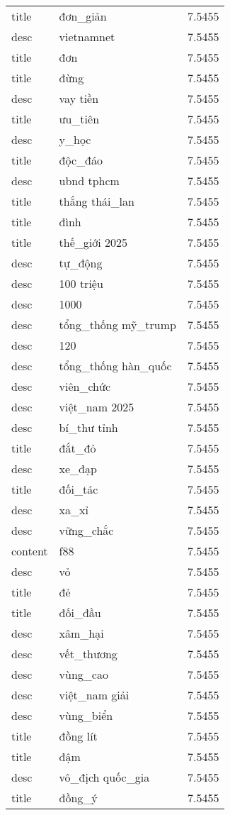 \documentclass{article}
\begin{document}
\begin{tabular}{lll}
title & đơn\_giản & 7.5455\\
desc & vietnamnet & 7.5455\\
title & đơn & 7.5455\\
title & đừng & 7.5455\\
desc & vay tiền & 7.5455\\
title & ưu\_tiên & 7.5455\\
desc & y\_học & 7.5455\\
title & độc\_đáo & 7.5455\\
desc & ubnd tphcm & 7.5455\\
title & thắng thái\_lan & 7.5455\\
title & đình & 7.5455\\
title & thế\_giới 2025 & 7.5455\\
desc & tự\_động & 7.5455\\
desc & 100 triệu & 7.5455\\
desc & 1000 & 7.5455\\
desc & tổng\_thống mỹ\_trump & 7.5455\\
desc & 120 & 7.5455\\
desc & tổng\_thống hàn\_quốc & 7.5455\\
desc & viên\_chức & 7.5455\\
desc & việt\_nam 2025 & 7.5455\\
desc & bí\_thư tỉnh & 7.5455\\
title & đắt\_đỏ & 7.5455\\
desc & xe\_đạp & 7.5455\\
title & đối\_tác & 7.5455\\
desc & xa\_xỉ & 7.5455\\
desc & vững\_chắc & 7.5455\\
content & f88 & 7.5455\\
desc & vỏ & 7.5455\\
title & đẻ & 7.5455\\
title & đối\_đầu & 7.5455\\
desc & xâm\_hại & 7.5455\\
desc & vết\_thương & 7.5455\\
desc & vùng\_cao & 7.5455\\
desc & việt\_nam giải & 7.5455\\
desc & vùng\_biển & 7.5455\\
title & đồng lít & 7.5455\\
title & đậm & 7.5455\\
desc & vô\_địch quốc\_gia & 7.5455\\
title & đồng\_ý & 7.5455\\

\end{tabular}
\end{document}

